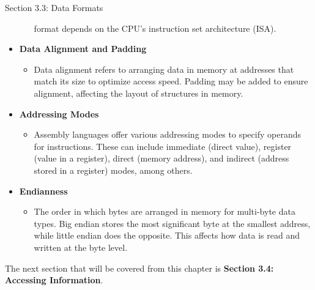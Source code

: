 \begin{notes}{Section 3.3: Data Formats}
\begin{itemize}
\begin{itemize}
            format depends on the CPU's instruction set architecture (ISA).
        \end{itemize}
        \item \textbf{Data Alignment and Padding}
        \begin{itemize}
            \item Data alignment refers to arranging data in memory at addresses that match its size to optimize access speed. Padding may be added to ensure alignment, affecting the layout of 
            structures in memory.
        \end{itemize}
        \item \textbf{Addressing Modes}
        \begin{itemize}
            \item Assembly languages offer various addressing modes to specify operands for instructions. These can include immediate (direct value), register (value in a register), direct (memory 
            address), and indirect (address stored in a register) modes, among others.
        \end{itemize}
        \item \textbf{Endianness}
        \begin{itemize}
            \item The order in which bytes are arranged in memory for multi-byte data types. Big endian stores the most significant byte at the smallest address, while little endian does the opposite. 
            This affects how data is read and written at the byte level.
        \end{itemize}
    \end{itemize}
\end{notes}

The next section that will be covered from this chapter is \textbf{Section 3.4: Accessing Information}.


